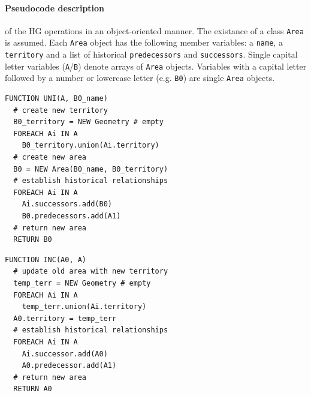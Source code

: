 
\paragraph{Pseudocode description} %
\label{par:pseudocode_description}

of the HG operations in an object-oriented manner. The existance of a class \texttt{Area} is assumed. Each \texttt{Area} object has the following member variables: a \texttt{name}, a \texttt{territory} and a list of historical \texttt{predecessors} and \texttt{successors}. Single capital letter variables (\texttt{A}/\texttt{B}) denote arrays of \texttt{Area} objects. Variables with a capital letter followed by a number or lowercase letter (e.g. \texttt{B0}) are single \texttt{Area} objects.

\begin{minipage}[t]{0.47\textwidth}
\begin{lstlisting}[language=pseudocode,
  caption=Unification]
FUNCTION UNI(A, B0_name)
  # create new territory
  B0_territory = NEW Geometry # empty
  FOREACH Ai IN A
    B0_territory.union(Ai.territory)
  # create new area
  B0 = NEW Area(B0_name, B0_territory)
  # establish historical relationships
  FOREACH Ai IN A
    Ai.successors.add(B0)
    B0.predecessors.add(A1)
  # return new area
  RETURN B0
\end{lstlisting}
\end{minipage}    %
\hspace{3.0em}    %
\begin{minipage}[t]{0.47\textwidth}
\begin{lstlisting}[language=pseudocode,
  caption=Incorporation]
FUNCTION INC(A0, A)
  # update old area with new territory
  temp_terr = NEW Geometry # empty
  FOREACH Ai IN A
    temp_terr.union(Ai.territory)
  A0.territory = temp_terr
  # establish historical relationships
  FOREACH Ai IN A
    Ai.successor.add(A0)
    A0.predecessor.add(A1)
  # return new area
  RETURN A0
\end{lstlisting}
\end{minipage}

